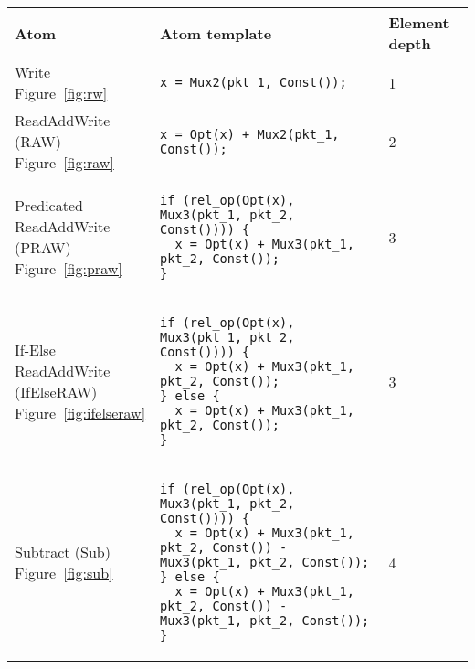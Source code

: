 \begin{table*}[!htbp]
\begin{scriptsize}
  \center
  \begin{tabular}{|p{}|p{}|p{}|}
      \hline
      Atom & Atom template & Element depth\\
\hline
\pbox{0.1\textwidth}{Write\\Figure~\ref{fig:rw}} &
{\begin{lstlisting}[style=customctable]
x = Mux2(pkt_1, Const());
\end{lstlisting}} &
1 \\

\hline
\pbox{0.1\textwidth}{ReadAddWrite\\(RAW)\\Figure~\ref{fig:raw}} &
{\begin{lstlisting}[style=customctable]
x = Opt(x) + Mux2(pkt_1, Const());
\end{lstlisting}} &
2 \\

\hline
\pbox{0.1\textwidth}
{Predicated\\
ReadAddWrite\\(PRAW)\\Figure~\ref{fig:praw}} &
{\begin{lstlisting}[style=customctable]
if (rel_op(Opt(x), Mux3(pkt_1, pkt_2, Const()))) {
  x = Opt(x) + Mux3(pkt_1, pkt_2, Const());
}
\end{lstlisting}} &
3 \\

\hline
\pbox{0.1\textwidth}
{If-Else\\
ReadAddWrite\\(IfElseRAW)\\Figure~\ref{fig:ifelseraw}} &
{\begin{lstlisting}[style=customctable]
if (rel_op(Opt(x), Mux3(pkt_1, pkt_2, Const()))) {
  x = Opt(x) + Mux3(pkt_1, pkt_2, Const());
} else {
  x = Opt(x) + Mux3(pkt_1, pkt_2, Const());
}
\end{lstlisting}} &
3 \\

\hline
\pbox{0.1\textwidth}
{Subtract (Sub)\\Figure~\ref{fig:sub}} &
{\begin{lstlisting}[style=customctable]
if (rel_op(Opt(x), Mux3(pkt_1, pkt_2, Const()))) {
  x = Opt(x) + Mux3(pkt_1, pkt_2, Const()) - Mux3(pkt_1, pkt_2, Const());
} else {
  x = Opt(x) + Mux3(pkt_1, pkt_2, Const()) - Mux3(pkt_1, pkt_2, Const());
}
\end{lstlisting}}&
4 \\


\end{tabular}
\end{scriptsize}
\end{table*}
